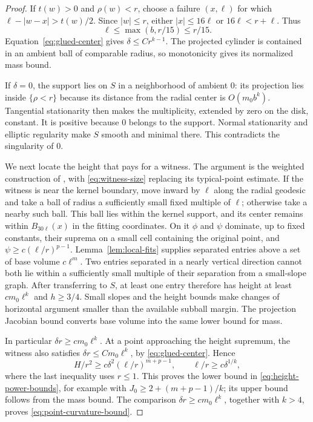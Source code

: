 \begin{proof}
If $t(w)>0$ and $\rho(w)<r$, choose a failure $(x,\ell)$ for which
$\ell-|w-x|>t(w)/2$. Since $|w|\le r$, either $|x|\le16\ell$ or
$16\ell<r+\ell$. Thus
\begin{equation}\label{eq:witness-size}
 \ell\le\max(b,r/15)\le r/15.
\end{equation}
Equation~\eqref{eq:glued-center} gives $\delta\le Cr^{k-1}$.
The projected cylinder is contained in an ambient ball of comparable
radius, so monotonicity gives its normalized mass bound.

If $\delta=0$, the support lies on $S$ in a neighborhood of ambient
$0$: its projection lies inside $\{\rho<r\}$ because its distance
from the radial center is $O(m_0b^k)$.
Tangential stationarity then makes the multiplicity, extended by zero
on the disk, constant. It is positive because $0$ belongs to the
support. Normal stationarity and elliptic regularity make $S$ smooth
and minimal there. This contradicts the singularity of $0$.

We next locate the height that pays for a witness. The argument is the
weighted construction of \cite[Proposition~7.4]{AE}, with
\eqref{eq:witness-size} replacing its typical-point estimate.
If the witness is near the kernel boundary, move inward by $\ell$
along the radial geodesic and take a ball of radius a sufficiently
small fixed multiple of $\ell$; otherwise take a nearby such ball.
This ball lies within the kernel support, and its center remains within
$B_{30\ell}(x)$ in the fitting coordinates. On it $\phi$ and $\psi$
dominate, up to fixed constants, their suprema on a small cell containing
the original point, and
$\psi\ge c(\ell/r)^{p-1}$.
Lemma~\ref{lem:local-fits} supplies separated entries above a set of
base volume $c\ell^m$. Two entries separated in a nearly vertical
direction cannot both lie within a sufficiently small multiple of their
separation from a small-slope graph. After transferring to $S$, at
least one entry therefore has height at least $cm_0\ell^k$ and
$h\ge3/4$. Small slopes and the height bounds make changes of horizontal
argument smaller than the available subball margin. The projection
Jacobian bound converts base volume into the same lower bound for mass.

In particular $\delta r\ge cm_0\ell^k$. At a point approaching the
height supremum, the witness also satisfies
$\delta r\le Cm_0\ell^k$, by \eqref{eq:glued-center}. Hence
\[
 H/r^2\ge c\delta^2(\ell/r)^{m+p-1},
 \qquad \ell/r\ge c\delta^{1/k},
\]
where the last inequality uses $r\le1$. This proves the lower bound
in \eqref{eq:height-power-bounds}, for example with
$J_0\ge2+(m+p-1)/k$; its upper bound follows from the mass bound.
The comparison $\delta r\ge cm_0\ell^k$, together with
$k>4$, proves \eqref{eq:point-curvature-bound}.


\end{proof}
